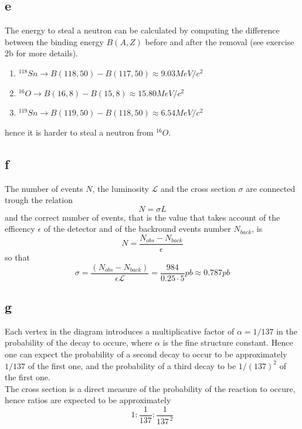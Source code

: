 \subsection*{e}
The energy to steal a neutron can be calculated by computing the difference between the binding energy $B(A, Z)$ before and after the removal (see exercise 2b for more details). 
\begin{enumerate}
    \item $^{118}Sn \rightarrow B(118, 50) - B(117, 50) \approx 9.03 MeV/c^2$
    \item $^{16}O \rightarrow B(16, 8) - B(15, 8) \approx 15.80 MeV/c^2$
    \item $^{119}Sn \rightarrow B(119, 50) - B(118, 50) \approx 6.54 MeV/c^2$
\end{enumerate}
hence it is harder to steal a neutron from $^{16}O$.

\subsection*{f}
The number of events $N$, the luminosity $\mathcal{L}$ and the cross section $\sigma$ are connected trough the relation
\begin{equation*}
    N = \sigma L
\end{equation*}
and the correct number of events, that is the value that takes account of the efficency $\epsilon$ of the detector and of the backround events number $N_{back}$, is
\begin{equation*}
    N = \frac{N_{obs} - N_{back}}{\epsilon}
\end{equation*}
so that
\begin{equation*}
\sigma= \frac{(N_{obs}-N_{back})}{\epsilon \mathcal{L}} = \frac{984}{0.25 \cdot 5} pb \approx 0.787 pb
\end{equation*} 

\subsection*{g}
Each vertex in the diagram introduces a multiplicative factor of $\alpha = 1/137$ in the probability of the decay to occure, where $\alpha$ is the fine structure constant.
Hence one can expect the probability of a second decay to occur to be approximately $1/137$ of the first one, and the probability of a third decay to be $1/(137)^2$ of the first one. \\
The cross section is a direct measure of the probability of the reaction to occure, hence ratios are expected to be approximately
\begin{equation*}
    1 : \frac{1}{137} : \frac{1}{137^{\, 2}}
\end{equation*}